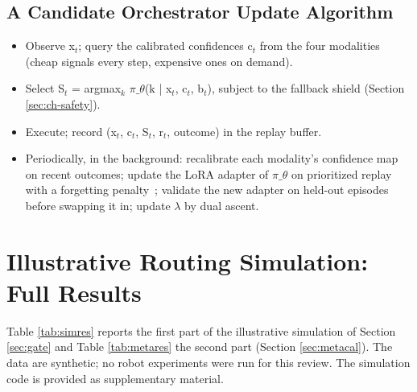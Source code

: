 \documentclass[journal]{IEEEtran}
\begin{document}
\subsection{A Candidate Orchestrator Update Algorithm}\label{app:alg}
\begin{itemize}
\item Observe x\ensuremath{_t}; query the calibrated confidences c\ensuremath{_t} from the four modalities (cheap signals every step, expensive ones on demand).
\item Select S\ensuremath{_t} = argmax\ensuremath{_k} \ensuremath{\ensuremath{\pi}\_{\ensuremath{\theta}}}(k | x\ensuremath{_t}, c\ensuremath{_t}, b\ensuremath{_t}), subject to the fallback shield (Section \ref{sec:ch-safety}).
\item Execute; record (x\ensuremath{_t}, c\ensuremath{_t}, S\ensuremath{_t}, r\ensuremath{_t}, outcome) in the replay buffer.
\item Periodically, in the background: recalibrate each modality's confidence map on recent outcomes; update the LoRA adapter of \ensuremath{\ensuremath{\pi}\_{\ensuremath{\theta}}} on prioritized replay~\cite{Schaul2016} with a forgetting penalty~\cite{Kirkpatrick2017}; validate the new adapter on held-out episodes before swapping it in; update \ensuremath{\lambda} by dual ascent.
\end{itemize}


\section{Illustrative Routing Simulation: Full Results}\label{app:sim}
Table \ref{tab:simres} reports the first part of the illustrative simulation of Section \ref{sec:gate} and Table \ref{tab:metares} the second part (Section \ref{sec:metacal}). The data are synthetic; no robot experiments were run for this review. The simulation code is provided as supplementary material.
\end{document}
